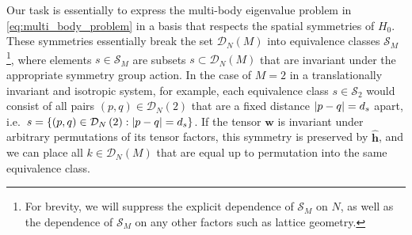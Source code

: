 \documentclass[nofootinbib,notitlepage,11pt]{revtex4-2}
\newcommand{\p}[1]{\left(#1\right)} %
\renewcommand{\set}[1]{\left\{#1\right\}} %
\newcommand{\m}{\bm} %
\newcommand{\1}{\mathds{1}}
\newcommand{\D}{\mathcal{D}}
\renewcommand{\S}{\mathcal{S}}
\begin{document}
Our task is essentially to express the multi-body eigenvalue problem
in \eqref{eq:multi_body_problem} in a basis that respects the spatial
symmetries of $H_0$.  These symmetries essentially break the set
$\D_N\p{M}$ into equivalence classes $\S_M$\footnote{For brevity, we
  will suppress the explicit dependence of $\S_M$ on $N$, as well as
  the dependence of $\S_M$ on any other factors such as lattice
  geometry.}, where elements $s\in\S_M$ are subsets
$s\subset\D_N\p{M}$ that are invariant under the appropriate symmetry
group action.  In the case of $M=2$ in a translationally invariant and
isotropic system, for example, each equivalence class $s\in\S_2$ would
consist of all pairs $\p{p,q}\in\D_N\p{2}$ that are a fixed distance
$\abs{p-q}=d_s$ apart,
i.e.~$s=\set{\p{p,q}\in\D_N\p{2}:\abs{p-q}=d_s}$.  If the tensor
$\m w$ is invariant under arbitrary permutations of its tensor
factors, this symmetry is preserved by $\hat{\m h}$, and we can place
all $k\in\D_N\p{M}$ that are equal up to permutation into the same
equivalence class.
\end{document}
